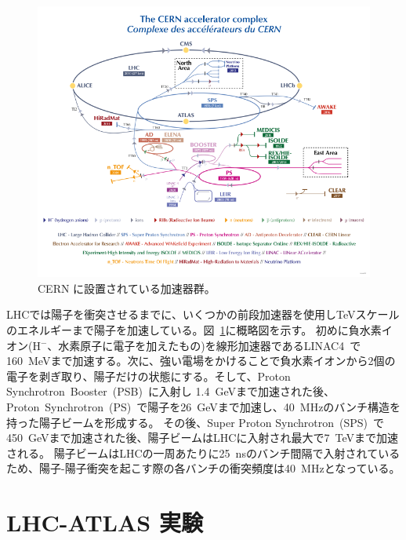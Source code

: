 \begin{figure}[tb]
  \centering
  \includegraphics[clip, width=14cm]{fig/2/CCC-v2022.pdf}
  \caption{CERN に設置されている加速器群\cite{article:accelerator-complex}。}
  \label{fig:LHC加速器}
\end{figure}


LHCでは陽子を衝突させるまでに、いくつかの前段加速器を使用しTeVスケールのエネルギーまで陽子を加速している。図~\ref{fig:LHC加速器}に概略図を示す。
初めに負水素イオン(H$^-$、水素原子に電子を加えたもの)を線形加速器であるLINAC4~\cite{article:Linearaccelerator4}で160~MeVまで加速する。次に、強い電場をかけることで負水素イオンから2個の電子を剥ぎ取り、陽子だけの状態にする。そして、Proton Synchrotron~Booster~(PSB)~\cite{article:TheProtonSynchrotronBooster}に入射し 1.4~GeVまで加速された後、Proton~Synchrotron~(PS)~\cite{article:TheProtonSynchrotron}で陽子を26~GeVまで加速し、40~MHzのバンチ構造を持った陽子ビームを形成する。
その後、Super Proton Synchrotron~(SPS)~\cite{article:TheSuperProtonSynchrotron}で450~GeVまで加速された後、陽子ビームはLHCに入射され最大で7~TeVまで加速される。
陽子ビームはLHCの一周あたりに25~nsのバンチ間隔で入射されているため、陽子-陽子衝突を起こす際の各バンチの衝突頻度は40~MHzとなっている。



\section{LHC-ATLAS 実験}\label{section2-2}

